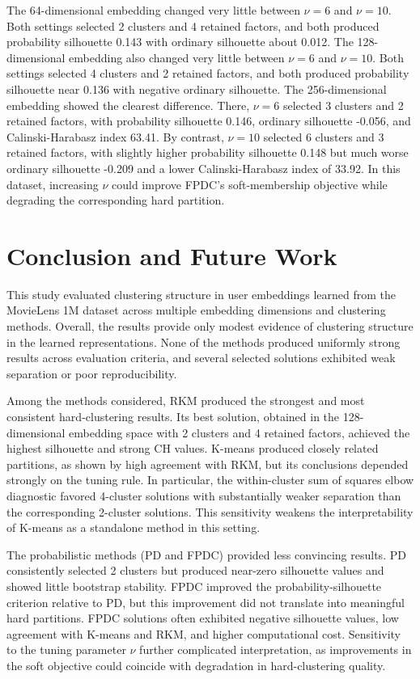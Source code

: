 \documentclass[
  11pt,
  letterpaper,
  DIV=11,
  numbers=noendperiod]{scrartcl}
\begin{document}
The 64-dimensional embedding changed very little between \(\nu = 6\) and
\(\nu = 10\). Both settings selected 2 clusters and 4 retained factors,
and both produced probability silhouette 0.143 with ordinary silhouette
about 0.012. The 128-dimensional embedding also changed very little
between \(\nu = 6\) and \(\nu = 10\). Both settings selected 4 clusters
and 2 retained factors, and both produced probability silhouette near
0.136 with negative ordinary silhouette. The 256-dimensional embedding
showed the clearest difference. There, \(\nu = 6\) selected 3 clusters
and 2 retained factors, with probability silhouette 0.146, ordinary
silhouette -0.056, and Calinski-Harabasz index 63.41. By contrast,
\(\nu = 10\) selected 6 clusters and 3 retained factors, with slightly
higher probability silhouette 0.148 but much worse ordinary silhouette
-0.209 and a lower Calinski-Harabasz index of 33.92. In this dataset,
increasing \(\nu\) could improve FPDC's soft-membership objective while
degrading the corresponding hard partition.

\section{Conclusion and Future
Work}\label{sec-conclusion-and-future-work}

This study evaluated clustering structure in user embeddings learned
from the MovieLens 1M dataset across multiple embedding dimensions and
clustering methods. Overall, the results provide only modest evidence of
clustering structure in the learned representations. None of the methods
produced uniformly strong results across evaluation criteria, and
several selected solutions exhibited weak separation or poor
reproducibility.

Among the methods considered, RKM produced the strongest and most
consistent hard-clustering results. Its best solution, obtained in the
128-dimensional embedding space with 2 clusters and 4 retained factors,
achieved the highest silhouette and strong CH values. K-means produced
closely related partitions, as shown by high agreement with RKM, but its
conclusions depended strongly on the tuning rule. In particular, the
within-cluster sum of squares elbow diagnostic favored 4-cluster
solutions with substantially weaker separation than the corresponding
2-cluster solutions. This sensitivity weakens the interpretability of
K-means as a standalone method in this setting.

The probabilistic methods (PD and FPDC) provided less convincing
results. PD consistently selected 2 clusters but produced near-zero
silhouette values and showed little bootstrap stability. FPDC improved
the probability-silhouette criterion relative to PD, but this
improvement did not translate into meaningful hard partitions. FPDC
solutions often exhibited negative silhouette values, low agreement with
K-means and RKM, and higher computational cost. Sensitivity to the
tuning parameter \(\nu\) further complicated interpretation, as
improvements in the soft objective could coincide with degradation in
hard-clustering quality.
\end{document}
